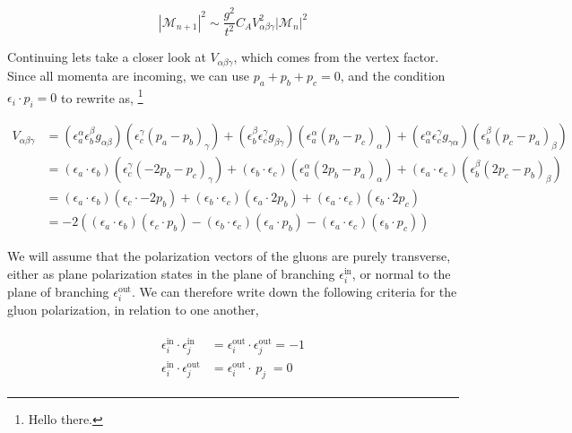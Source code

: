 \documentclass[main.tex]{subfiles}
\begin{document}
\begin{equation}\label{eqn: ggg_matrix_element}
    |\mathcal{M}_{n+1}|^2 \sim \frac{g^2}{t^2} C_A V_{\alpha\beta\gamma}^2  |\mathcal{M}_n|^2
\end{equation}

Continuing lets take a closer look at \(V_{\alpha\beta\gamma}\), which comes from the vertex factor. Since all momenta are incoming, we can use \(p_a +p_b +p_c = 0\), and the condition \(\epsilon_i \cdot p_i = 0\) to rewrite as, \footnote{Hello there.}

\begin{align}\label{eqn: ggg_vertex_factor_Ellis_5.6}
    V_{\alpha\beta\gamma} &= 
    (\epsilon_a^\alpha \epsilon_b^\beta g_{\alpha\beta})(\epsilon_c^\gamma (p_a-p_b)_\gamma) + 
    (\epsilon_b^\beta \epsilon_c^\gamma g_{\beta\gamma})(\epsilon_a^\alpha (p_b-p_c)_\alpha) + 
    (\epsilon_a^\alpha \epsilon_c^\gamma g_{\gamma\alpha})(\epsilon_b^\beta (p_c-p_a)_\beta) \nonumber \\
    &=
    (\epsilon_a \cdot \epsilon_b)(\epsilon_c^\gamma (-2p_b- p_c)_\gamma) + 
    (\epsilon_b \cdot \epsilon_c)(\epsilon_a^\alpha (2p_b -p_a)_\alpha) + 
    (\epsilon_a \cdot \epsilon_c)(\epsilon_b^\beta (2p_c-p_b)_\beta) \nonumber \\
    &= 
    (\epsilon_a \cdot \epsilon_b)(\epsilon_c \cdot -2p_b) + 
    (\epsilon_b \cdot \epsilon_c)(\epsilon_a \cdot 2p_b) +
    (\epsilon_a \cdot \epsilon_c)(\epsilon_b \cdot 2p_c) \nonumber\\
    &= -2\left(
    (\epsilon_a \cdot \epsilon_b)(\epsilon_c \cdot p_b) - 
    (\epsilon_b \cdot \epsilon_c)(\epsilon_a \cdot p_b) -
    (\epsilon_a \cdot \epsilon_c)(\epsilon_b \cdot p_c) 
    \right)
\end{align}

We will assume that the polarization vectors of the gluons are purely transverse, either as plane polarization states in the plane of branching \(\epsilon_i^{\text{in}}\), or normal to the plane of branching \(\epsilon_i^{\text{out}}\). We can therefore write down the following criteria for the gluon polarization, in relation to one another,

\begin{align}\label{eqn: gluon_polarization_criteria_ellis_5.7}
    \begin{split}
    \epsilon_i^{\text{in}} \cdot \epsilon_j^{\text{in}} &= \epsilon_i^{\text{out}} \cdot \epsilon_j^{\text{out}} = -1  \\
    \epsilon_i^{\text{in}} \cdot \epsilon_j^{\text{out}} &= \epsilon_i^{\text{out}} \cdot \, p_j \; = 0
    \end{split}
\end{align}
\end{document}
